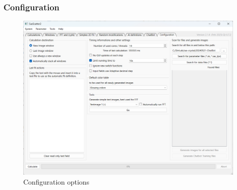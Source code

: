\documentclass[11pt]{article} %
\begin{document}
\clearpage

\subsubsection{Configuration}
\begin{figure}[H]
 \centering
 \includegraphics[width=\textwidth]{gui-config.png}
 \caption{Configuration options}
\end{figure}
\end{document}
